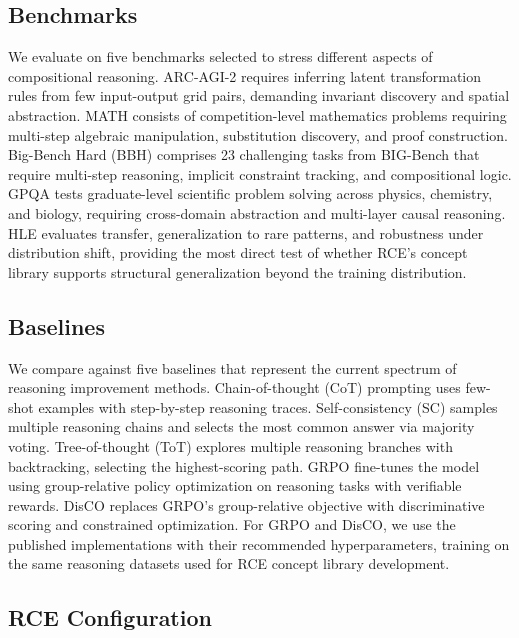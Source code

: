 \documentclass[11pt]{article}
\begin{document}
\subsection{Benchmarks}

We evaluate on five benchmarks selected to stress different aspects of compositional reasoning. ARC-AGI-2 \cite{chollet2019measure} requires inferring latent transformation rules from few input-output grid pairs, demanding invariant discovery and spatial abstraction. MATH \cite{hendrycks2021math} consists of competition-level mathematics problems requiring multi-step algebraic manipulation, substitution discovery, and proof construction. Big-Bench Hard (BBH) \cite{suzgun2023bbh} comprises 23 challenging tasks from BIG-Bench that require multi-step reasoning, implicit constraint tracking, and compositional logic. GPQA \cite{rein2024gpqa} tests graduate-level scientific problem solving across physics, chemistry, and biology, requiring cross-domain abstraction and multi-layer causal reasoning. HLE \cite{phan2025hle} evaluates transfer, generalization to rare patterns, and robustness under distribution shift, providing the most direct test of whether RCE's concept library supports structural generalization beyond the training distribution.

\subsection{Baselines}

We compare against five baselines that represent the current spectrum of reasoning improvement methods. Chain-of-thought (CoT) prompting \cite{wei2022cot} uses few-shot examples with step-by-step reasoning traces. Self-consistency (SC) \cite{wang2023selfconsistency} samples multiple reasoning chains and selects the most common answer via majority voting. Tree-of-thought (ToT) \cite{yao2023tot} explores multiple reasoning branches with backtracking, selecting the highest-scoring path. GRPO \cite{shao2024deepseekmath} fine-tunes the model using group-relative policy optimization on reasoning tasks with verifiable rewards. DisCO \cite{zhang2025disco} replaces GRPO's group-relative objective with discriminative scoring and constrained optimization. For GRPO and DisCO, we use the published implementations with their recommended hyperparameters, training on the same reasoning datasets used for RCE concept library development.

\subsection{RCE Configuration}
\end{document}
